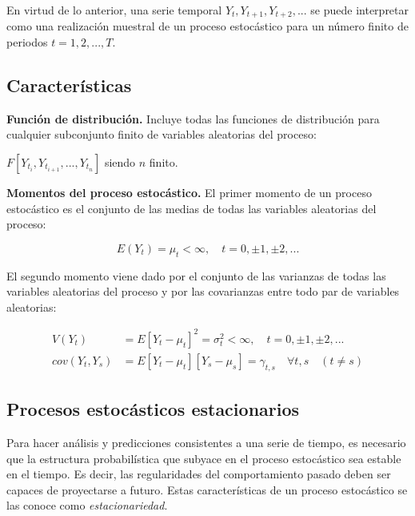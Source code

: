 \documentclass[a4paper,10pt]{article}
\begin{document}
En virtud de lo anterior, una serie temporal $Y_t, Y_{t+1},Y_{t+2},...$ se puede interpretar como una realización muestral de un proceso estocástico para un número finito de periodos $t=1,2,...,T$.

\subsection{Características}

\textbf{Función de distribución.} Incluye todas las funciones de distribución para cualquier subconjunto finito de variables aleatorias del proceso:

\begin{center}
$F[Y_{t_i}, Y_{t_{i+1}},...,Y_{t_n}]$ siendo $n$ finito.
\end{center}

\textbf{Momentos del proceso estocástico.} El primer momento de un proceso estocástico es el conjunto de las medias de todas las variables aleatorias del proceso:

\begin{equation}
E(Y_t) = \mu_t < \infty, \quad t = 0, \pm 1, \pm 2, ...
\end{equation}

El segundo momento viene dado por el conjunto de las varianzas de todas las variables aleatorias del proceso y por las covarianzas entre todo par de variables aleatorias:

\begin{equation}
\begin{split}
V(Y_t) & = E[Y_t - \mu_t]^2 = \sigma_t^2 < \infty, \quad t=0, \pm 1, \pm 2, ... \\
cov(Y_t,Y_s) & = E[Y_t - \mu_t][Y_s - \mu_s] = \gamma_{t,s} \quad \forall t,s \quad (t \neq s)
\end{split}
\end{equation}

\subsection{Procesos estocásticos estacionarios}

Para hacer análisis y predicciones consistentes a una serie de tiempo, es necesario que la estructura probabilística que subyace en el proceso estocástico sea estable en el tiempo. Es decir, las regularidades del comportamiento pasado deben ser capaces de proyectarse a futuro. Estas características de un proceso estocástico se las conoce como \textit{estacionariedad}.
\end{document}
